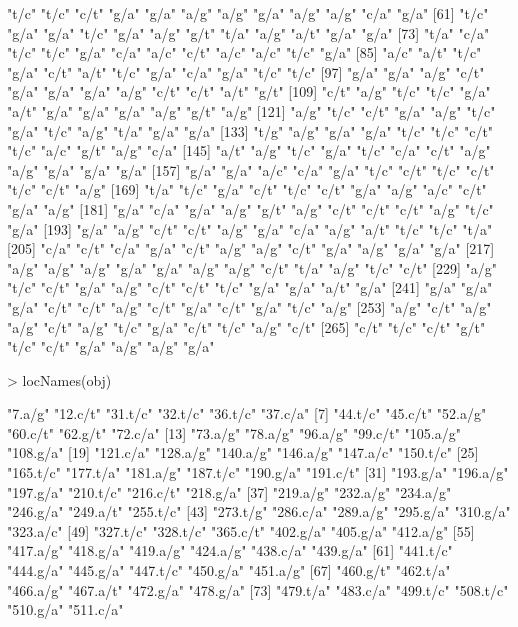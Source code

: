 \documentclass{article}
\begin{document}
\begin{Schunk}
\begin{Soutput}
 [49] "t/c" "t/c" "c/t" "g/a" "g/a" "a/g" "a/g" "g/a" "a/g" "a/g" "c/a" "g/a"
 [61] "t/c" "g/a" "g/a" "t/c" "g/a" "a/g" "g/t" "t/a" "a/g" "a/t" "g/a" "g/a"
 [73] "t/a" "c/a" "t/c" "t/c" "g/a" "c/a" "a/c" "c/t" "a/c" "a/c" "t/c" "g/a"
 [85] "a/c" "a/t" "t/c" "g/a" "c/t" "a/t" "t/c" "g/a" "c/a" "g/a" "t/c" "t/c"
 [97] "g/a" "g/a" "a/g" "c/t" "g/a" "g/a" "g/a" "a/g" "c/t" "c/t" "a/t" "g/t"
[109] "c/t" "a/g" "t/c" "t/c" "g/a" "a/t" "g/a" "g/a" "g/a" "a/g" "g/t" "a/g"
[121] "a/g" "t/c" "c/t" "g/a" "a/g" "t/c" "g/a" "t/c" "a/g" "t/a" "g/a" "g/a"
[133] "t/g" "a/g" "g/a" "g/a" "t/c" "t/c" "c/t" "t/c" "a/c" "g/t" "a/g" "c/a"
[145] "a/t" "a/g" "t/c" "g/a" "t/c" "c/a" "c/t" "a/g" "a/g" "g/a" "g/a" "g/a"
[157] "g/a" "g/a" "a/c" "c/a" "g/a" "t/c" "c/t" "t/c" "c/t" "t/c" "c/t" "a/g"
[169] "t/a" "t/c" "g/a" "c/t" "t/c" "c/t" "g/a" "a/g" "a/c" "c/t" "g/a" "a/g"
[181] "g/a" "c/a" "g/a" "a/g" "g/t" "a/g" "c/t" "c/t" "c/t" "a/g" "t/c" "g/a"
[193] "g/a" "a/g" "c/t" "c/t" "a/g" "g/a" "c/a" "a/g" "a/t" "t/c" "t/c" "t/a"
[205] "c/a" "c/t" "c/a" "g/a" "c/t" "a/g" "a/g" "c/t" "g/a" "a/g" "g/a" "g/a"
[217] "a/g" "a/g" "a/g" "g/a" "g/a" "a/g" "a/g" "c/t" "t/a" "a/g" "t/c" "c/t"
[229] "a/g" "t/c" "c/t" "g/a" "a/g" "c/t" "c/t" "t/c" "g/a" "g/a" "a/t" "g/a"
[241] "g/a" "g/a" "g/a" "c/t" "c/t" "a/g" "c/t" "g/a" "c/t" "g/a" "t/c" "a/g"
[253] "a/g" "c/t" "a/g" "a/g" "c/t" "a/g" "t/c" "g/a" "c/t" "t/c" "a/g" "c/t"
[265] "c/t" "t/c" "c/t" "g/t" "t/c" "c/t" "g/a" "a/g" "a/g" "g/a"
\end{Soutput}
\begin{Sinput}
> locNames(obj)
\end{Sinput}
\begin{Soutput}
  [1] "7.a/g"    "12.c/t"   "31.t/c"   "32.t/c"   "36.t/c"   "37.c/a"  
  [7] "44.t/c"   "45.c/t"   "52.a/g"   "60.c/t"   "62.g/t"   "72.c/a"  
 [13] "73.a/g"   "78.a/g"   "96.a/g"   "99.c/t"   "105.a/g"  "108.g/a" 
 [19] "121.c/a"  "128.a/g"  "140.a/g"  "146.a/g"  "147.a/c"  "150.t/c" 
 [25] "165.t/c"  "177.t/a"  "181.a/g"  "187.t/c"  "190.g/a"  "191.c/t" 
 [31] "193.g/a"  "196.a/g"  "197.g/a"  "210.t/c"  "216.c/t"  "218.g/a" 
 [37] "219.a/g"  "232.a/g"  "234.a/g"  "246.g/a"  "249.a/t"  "255.t/c" 
 [43] "273.t/g"  "286.c/a"  "289.a/g"  "295.g/a"  "310.g/a"  "323.a/c" 
 [49] "327.t/c"  "328.t/c"  "365.c/t"  "402.g/a"  "405.g/a"  "412.a/g" 
 [55] "417.a/g"  "418.g/a"  "419.a/g"  "424.a/g"  "438.c/a"  "439.g/a" 
 [61] "441.t/c"  "444.g/a"  "445.g/a"  "447.t/c"  "450.g/a"  "451.a/g" 
 [67] "460.g/t"  "462.t/a"  "466.a/g"  "467.a/t"  "472.g/a"  "478.g/a" 
 [73] "479.t/a"  "483.c/a"  "499.t/c"  "508.t/c"  "510.g/a"  "511.c/a" 

\end{Soutput}
\end{Schunk}
\end{document}
